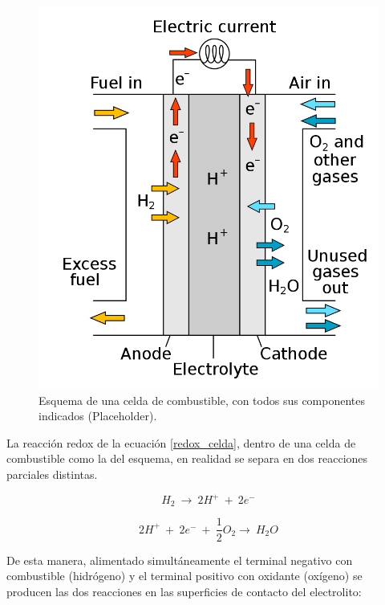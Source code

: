 \begin{figure}[h]
    \centering
    \includegraphics[scale=0.35]{Imagenes/Fuel Cell.png}
    \caption{Esquema de una celda de combustible, con todos sus componentes indicados (Placeholder).}
    \label{fuel_cell}
\end{figure}

La reacción redox de la ecuación \ref{redox_celda}, dentro de una celda de combustible como la del esquema, en realidad se separa en dos reacciones parciales distintas.

\begin{equation}\label{redox_anodo}
    H_2\ \longrightarrow\ 2H^{+}\ +\ 2e^-
\end{equation}

\begin{equation}\label{redox_catodo}
    2H^{+}\ +\ 2e^-\ +\ \frac{1}{2}O_2\longrightarrow\ H_2O
\end{equation}

De esta manera, alimentado simultáneamente el terminal negativo con combustible (hidrógeno) y el terminal positivo con oxidante (oxígeno) se producen las dos reacciones en las superficies de contacto del electrolito:

